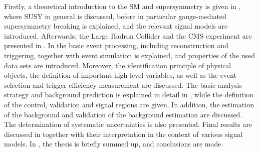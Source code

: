 Firstly, a theoretical introduction to the SM and supersymmetry is given in , where SUSY in general is discussed, before in particular gauge-mediated supersymmetry breaking is explained, and the relevant signal models are introduced. Afterwards, the Large Hadron Collider and the CMS experiment are presented in . In  the basic event processing, including reconstruction and triggering, together with event simulation is explained, and properties of the used data sets are introduced. Moreover, the identification principle of physical objects, the definition of important high level variables, as well as the event selection and trigger efficiency measurement are discussed. The basic analysis strategy and background prediction is explained in detail in , while the definition of the control, validation and signal regions are given. In addition, the estimation of the background and validation of the background estimation are discussed. The determination of systematic uncertainties is also presented. Final results are discussed in  together with their interpretation in the context of various signal models. In , the thesis is briefly summed up, and conclusions are made.
